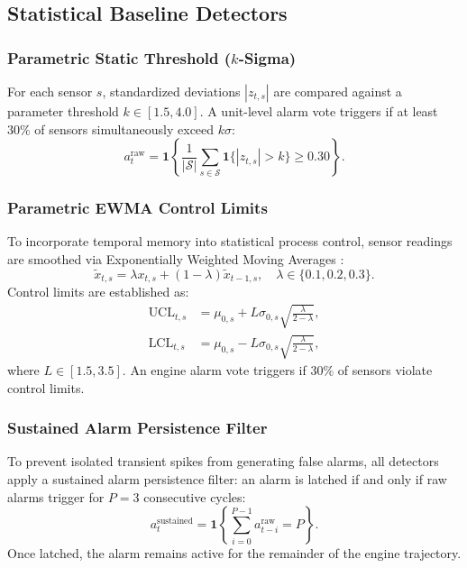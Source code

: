 \subsection{Statistical Baseline Detectors}

\subsubsection{Parametric Static Threshold ($k$-Sigma)}
For each sensor $s$, standardized deviations $|z_{t, s}|$ are compared against a parameter threshold $k \in [1.5, 4.0]$. A unit-level alarm vote triggers if at least $30\%$ of sensors simultaneously exceed $k\sigma$:
\begin{equation}
a_t^{\text{raw}} = \mathbf{1}\left\{ \frac{1}{|\mathcal{S}|} \sum_{s \in \mathcal{S}} \mathbf{1}\{|z_{t, s}| > k\} \ge 0.30 \right\}.
\end{equation}

\subsubsection{Parametric EWMA Control Limits}
To incorporate temporal memory into statistical process control, sensor readings are smoothed via Exponentially Weighted Moving Averages \cite{montgomery2009introduction}:
\begin{equation}
\tilde{x}_{t, s} = \lambda x_{t, s} + (1 - \lambda) \tilde{x}_{t-1, s}, \quad \lambda \in \{0.1, 0.2, 0.3\}.
\end{equation}
Control limits are established as:
\begin{align}
\text{UCL}_{t, s} &= \mu_{0, s} + L \sigma_{0, s} \sqrt{\frac{\lambda}{2 - \lambda}}, \\
\text{LCL}_{t, s} &= \mu_{0, s} - L \sigma_{0, s} \sqrt{\frac{\lambda}{2 - \lambda}},
\end{align}
where $L \in [1.5, 3.5]$. An engine alarm vote triggers if $30\%$ of sensors violate control limits.

\subsubsection{Sustained Alarm Persistence Filter}
To prevent isolated transient spikes from generating false alarms, all detectors apply a sustained alarm persistence filter: an alarm is latched if and only if raw alarms trigger for $P=3$ consecutive cycles:
\begin{equation}
a_t^{\text{sustained}} = \mathbf{1}\left\{ \sum_{i=0}^{P-1} a_{t-i}^{\text{raw}} = P \right\}.
\label{eq:sustained_alarm}
\end{equation}
Once latched, the alarm remains active for the remainder of the engine trajectory.

